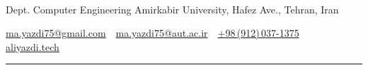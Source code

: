 \documentclass[letterpaper,MMMyyyy,nonstopmode]{resume}
\newcommand{\CVAuthor}{Ali Yazdi}
\newcommand{\CVWebpageName}{aliyazdi.tech}
\newcommand{\CVWebpage}{https://aliyazdi.tech/}
\begin{document}

\Title{\CVAuthor}

\begin{SubTitle}
\normalsize{
\href{https://www.linkedin.com/in/aliyazdi75}
{\faLinkedin}
\,\SubBulletSymbol\,
\href{https://github.com/aliyazdi75}
{\faGithub}
\,\SubBulletSymbol\,
\href{https://twitter.com/aliyazdi75}
{\faTwitter}
\,\SubBulletSymbol\,
\href{https://join.skype.com/invite/h3jUqpJH9jLh}
{\faSkype}
\,\SubBulletSymbol\,
\href{https://t.me/aliyazdi75}
{\faTelegram}
\,\SubBulletSymbol\,
\href{https://www.instagram.com/aliyazdi75/}
{\faInstagram}
\,\SubBulletSymbol\,
\href{mailto:ma.yazdi75@gmail.com}
{\faEnvelope}
\,\SubBulletSymbol\,
\href{tel:+989120371375}
{\faPhone}
\,\SubBulletSymbol\,
\href{\CVWebpage}
{\faGlobe}
}
\par
Dept. Computer Engineering Amirkabir University, Hafez Ave., Tehran, Iran
\par
\href{mailto:ma.yazdi75@gmail.com}
{ma.yazdi75@gmail.com}
\,\SubBulletSymbol\,
\href{mailto:ma.yazdi75@aut.ac.ir}
{ma.yazdi75@aut.ac.ir}
\,\SubBulletSymbol\,
\href{tel:+989120371375}
{+98\,(912)\,037-1375}
\,\SubBulletSymbol\,
\href{\CVWebpage}
{\CVWebpageName}
\end{SubTitle}

\smallskip\hrule
\end{document}
